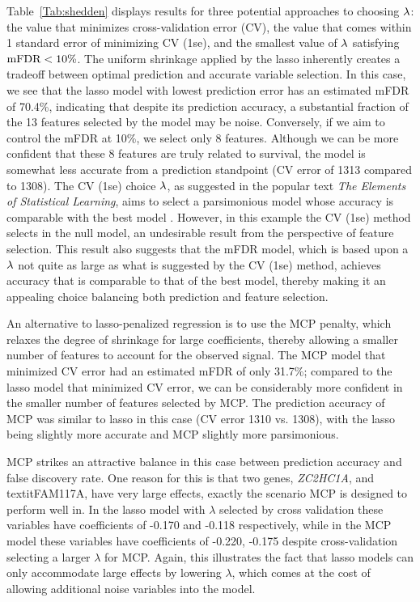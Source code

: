 Table~\ref{Tab:shedden} displays results for three potential approaches to choosing $\lambda$: the value that minimizes cross-validation error (CV), the value that comes within 1 standard error of minimizing CV (1se), and the smallest value of $\lambda$ satisfying $\textrm{mFDR} < 10\%$.  The uniform shrinkage applied by the lasso inherently creates a tradeoff between optimal prediction and accurate variable selection. In this case, we see that the lasso model with lowest prediction error has an estimated mFDR of 70.4\%, indicating that despite its prediction accuracy, a substantial fraction of the 13 features selected by the model may be noise. Conversely, if we aim to control the mFDR at 10\%, we select only 8 features.  Although we can be more confident that these 8 features are truly related to survival, the model is somewhat less accurate from a prediction standpoint (CV error of 1313 compared to 1308).  The CV (1se) choice $\lambda$, as suggested in the popular text \textit{The Elements of Statistical Learning}, aims to select a parsimonious model whose accuracy is comparable with the best model \citep{Hastie2009}. However, in this example the CV (1se) method selects in the null model, an undesirable result from the perspective of feature selection. This result also suggests that the mFDR model, which is based upon a $\lambda$ not quite as large as what is suggested by the CV (1se) method, achieves accuracy that is comparable to that of the best model, thereby making it an appealing choice balancing both prediction and feature selection.


An alternative to lasso-penalized regression is to use the MCP penalty, which relaxes the degree of shrinkage for large coefficients, thereby allowing a smaller number of features to account for the observed signal.  The MCP model that minimized CV error had an estimated mFDR of only 31.7\%; compared to the lasso model that minimized CV error, we can be considerably more confident in the smaller number of features selected by MCP.  The prediction accuracy of MCP was similar to lasso in this case (CV error 1310 vs. 1308), with the lasso being slightly more accurate and MCP slightly more parsimonious.

MCP strikes an attractive balance in this case between prediction accuracy and false discovery rate.  One reason for this is that two genes, \textit{ZC2HC1A}, and textit{FAM117A}, have very large effects, exactly the scenario MCP is designed to perform well in. In the lasso model with $\lambda$ selected by cross validation these variables have coefficients of -0.170 and -0.118 respectively, while in the MCP model these variables have coefficients of -0.220, -0.175 despite cross-validation selecting a larger $\lambda$ for MCP.  Again, this illustrates the fact that lasso models can only accommodate large effects by lowering $\lambda$, which comes at the cost of allowing additional noise variables into the model.

